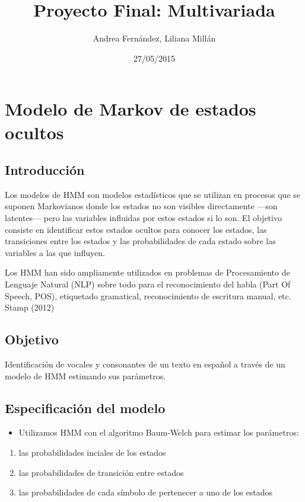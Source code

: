 \documentclass[]{article}
\title{Proyecto Final: Multivariada}
\author{Andrea Fernández, Liliana Millán}
\date{27/05/2015}
\begin{document}
\maketitle


{
\hypersetup{linkcolor=black}
\setcounter{tocdepth}{2}
\tableofcontents
}
\pagebreak

\section{Modelo de Markov de estados
ocultos}\label{modelo-de-markov-de-estados-ocultos}

\subsection{Introducción}\label{introduccion}

Los modelos de HMM son modelos estadísticos que se utilizan en procesos
que se suponen Markovianos donde los estados no son visibles
directamente ---son latentes--- pero las variables influidas por estos
estados si lo son. El objetivo consiste en identificar estos estados
ocultos para conocer los estados, las transiciones entre los estados y
las probabilidades de cada estado sobre las variables a las que
influyen.

Los HMM han sido ampliamente utilizados en problemas de Procesamiento de
Lenguaje Natural (NLP) sobre todo para el reconocimiento del habla (Part
Of Speech, POS), etiquetado gramatical, reconocimiento de escritura
manual, etc. Stamp (2012)

\subsection{Objetivo}\label{objetivo}

Identificación de vocales y consonantes de un texto en español a través
de un modelo de HMM estimando sus parámetros.

\subsection{Especificación del modelo}\label{especificacion-del-modelo}

\begin{itemize}
\itemsep1pt\parskip0pt
\item
  Utilizamos HMM con el algoritmo Baum-Welch para estimar los
  parámetros:
\end{itemize}

\begin{enumerate}
\def\labelenumi{\arabic{enumi}.}
\itemsep1pt\parskip0pt
\item
  las probabilidades inciales de los estados
\item
  las probabilidades de transición entre estados
\item
  las probabilidades de cada símbolo de pertenecer a uno de los estados
\end{enumerate}
\end{document}
